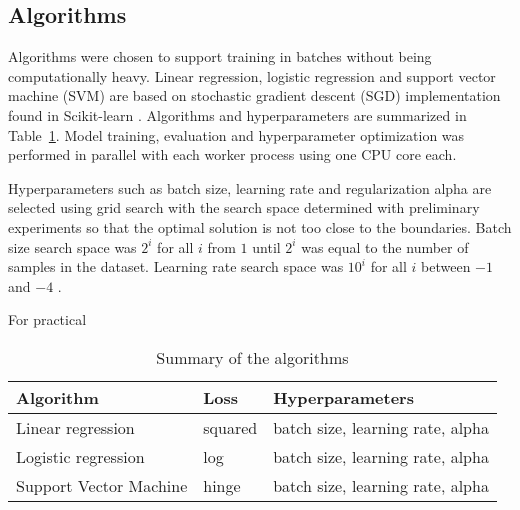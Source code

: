 \subsection{Algorithms}

Algorithms were chosen to support training in batches without being computationally heavy. Linear regression, logistic regression and support vector machine (SVM) are based on stochastic gradient descent (SGD) implementation found in Scikit-learn \parencite{pedregosaScikitlearnMachineLearning2011}. Algorithms and hyperparameters are summarized in Table~\ref{table:algorithms}. Model training, evaluation and hyperparameter optimization was performed in parallel with each worker process using one CPU core each.

Hyperparameters such as batch size, learning rate and regularization alpha are selected using grid search with the search space determined with preliminary experiments so that the optimal solution is not too close to the boundaries. Batch size search space was $2^i$ for all $i$ from $1$ until $2^i$ was equal to the number of samples in the dataset. Learning rate search space was $10^i$ for all $i$ between $-1$ and $-4$ .

For practical 

\begin{table}[h]
    \centering
    \begin{tabular}{lll}
        \toprule
        Algorithm              & Loss    & Hyperparameters                  \\
        \midrule
        Linear regression      & squared & batch size, learning rate, alpha \\
        Logistic regression    & log     & batch size, learning rate, alpha \\
        Support Vector Machine & hinge   & batch size, learning rate, alpha \\
        \bottomrule
    \end{tabular}
    \caption{Summary of the algorithms}
    \label{table:algorithms}
\end{table}


